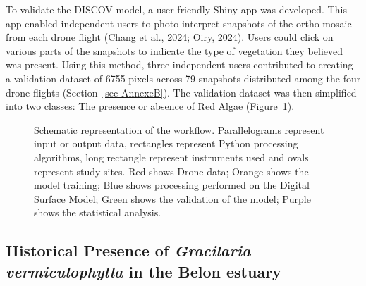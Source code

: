 \documentclass[
  letterpaper,
  11pt,
  english,
  singlespacing,
  headsepline]{MastersDoctoralThesis}
\begin{document}
\begin{spacing}{1.5}
To validate the DISCOV model, a user-friendly Shiny app was developed.
This app enabled independent users to photo-interpret snapshots of the
ortho-mosaic from each drone flight (Chang et al., 2024; Oiry, 2024).
Users could click on various parts of the snapshots to indicate the type
of vegetation they believed was present. Using this method, three
independent users contributed to creating a validation dataset of 6755
pixels across 79 snapshots distributed among the four drone flights
(Section~\ref{sec-AnnexeB}). The validation dataset was then simplified
into two classes: The presence or absence of Red Algae
(Figure~\ref{fig-Workflow_g}).

\begin{figure}


\caption{\label{fig-Workflow_g}Schematic representation of the workflow.
Parallelograms represent input or output data, rectangles represent
Python processing algorithms, long rectangle represent instruments used
and ovals represent study sites. Red shows Drone data; Orange shows the
model training; Blue shows processing performed on the Digital Surface
Model; Green shows the validation of the model; Purple shows the
statistical analysis.}

\end{figure}%

\subsection{\texorpdfstring{Historical Presence of \emph{Gracilaria
vermiculophylla} in the Belon
estuary}{Historical Presence of Gracilaria vermiculophylla in the Belon estuary}}\label{historical-presence-of-gracilaria-vermiculophylla-in-the-belon-estuary}


\end{spacing}
\end{document}
